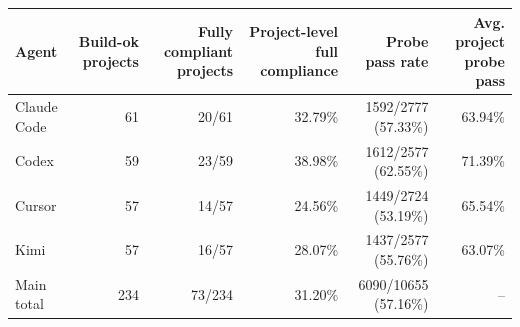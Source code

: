 \begin{tabular}{lrrrrr}
\toprule
Agent & Build-ok projects & Fully compliant projects & Project-level full compliance & Probe pass rate & Avg. project probe pass \\
\midrule
Claude Code & 61 & 20/61 & 32.79\% & 1592/2777 (57.33\%) & 63.94\% \\
Codex & 59 & 23/59 & 38.98\% & 1612/2577 (62.55\%) & 71.39\% \\
Cursor & 57 & 14/57 & 24.56\% & 1449/2724 (53.19\%) & 65.54\% \\
Kimi & 57 & 16/57 & 28.07\% & 1437/2577 (55.76\%) & 63.07\% \\
Main total & 234 & 73/234 & 31.20\% & 6090/10655 (57.16\%) & -- \\
\bottomrule
\end{tabular}
